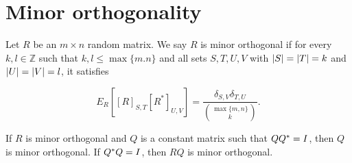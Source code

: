 

\section{Minor orthogonality}


\begin{definition}
    Let $R$ be an $m \times n$ random matrix. We say $R$ is minor orthogonal if for every $k,l \in \mathbb Z$ such that $k,l \le \max\{m.n\}$ and all sets $S,T,U,V$ with $\lvert S \rvert = \lvert T \rvert = k$ and $\lvert U \rvert = \lvert V \rvert = l$, it satisfies
    
    \begin{equation*}
        E_R\left[ [R]_{S,T} [R^*]_{U,V} \right] = \frac{\delta_{S,V}\delta_{T,U}}{\binom{\max\{m,n\}}{k}}.
    \end{equation*}
\end{definition}

\begin{lemma} \label{lemma:orth_trans_is_minorth}
    If $R$ is minor orthogonal and $Q$ is a constant matrix such that $QQ^* = I$, then $Q$ is minor orthogonal. If $Q^*Q = I$, then $RQ$ is minor orthogonal.
\end{lemma}


